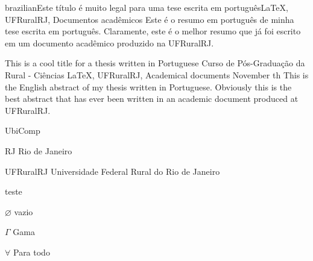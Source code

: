 \documentclass[tese]{UFRuralRJ}
\begin{document}
\def\tituloportugues{Este título é muito legal para uma tese escrita em português} %
\def\chavesportugues{LaTeX, UFRuralRJ, Documentos acadêmicos} %
\generalabstracttrue %
\begin{generalabstract}{brazilian}{\tituloportugues}{\chavesportugues} %
  Este é o resumo em português de minha tese escrita em português. Claramente, 
  este é o melhor resumo que já foi escrito em um documento acadêmico produzido
  na UFRuralRJ.
\end{generalabstract}


\generalabstracttrue
\begin{englishabstract}
{This is a cool title for a thesis written in Portuguese} %
{Curso de Pós-Graduação da Rural - Ciências} %
{LaTeX, UFRuralRJ, Academical documents} %
{November} %
{th} %
This is the English abstract of my thesis written in Portuguese. Obviously this
is the best abstract that has ever been written in an academic document produced
at UFRuralRJ.
\end{englishabstract}


\listoffigures %
\listoftables %
\listofappendix %

\begin{listofabbrv}{UbiComp} %
 \item [RJ] Rio de Janeiro
 \item [UFRuralRJ] Universidade Federal Rural do Rio de Janeiro
\end{listofabbrv}

\begin{listofsymbols}{teste} %
 \item [$\varnothing$] vazio %
 \item [$\Gamma$]  Gama      %
 \item [$\forall$] Para todo
\end{listofsymbols}
\end{document}
